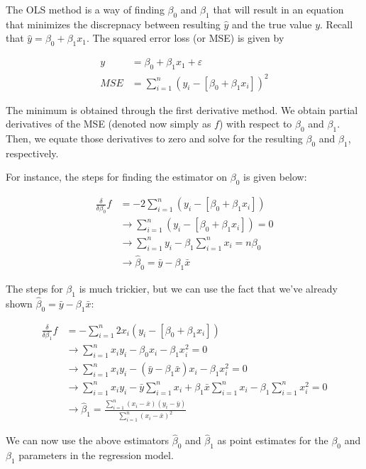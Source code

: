 \documentclass{article}
\begin{document}
The OLS method is a way of finding $\beta_0$ and $\beta_1$ that will result in an equation that minimizes the discrepnacy between resulting $\hat{y}$ and the true value $y$. Recall that $\hat{y} = \beta_0 + \beta_1 x_1$. The squared error loss (or MSE) is given by

$$
\begin{aligned}
y &= \beta_0 + \beta_1 x_1 + \varepsilon \\
MSE &= \sum^{n}_{i=1}(y_i - [\beta_0 + \beta_1 x_i])^2
\end{aligned}
$$

The minimum is obtained through the first derivative method. We obtain partial derivatives of the MSE (denoted now simply as $f$) with respect to $\beta_0$ and $\beta_1$. Then, we equate those derivatives to zero and solve for the resulting $\beta_0$ and $\beta_1$, respectively.

For instance, the steps for finding the estimator on $\beta_0$ is given below:

$$
\begin{aligned}
\frac{\delta}{\delta \beta_0} f &= - 2 \sum^{n}_{i=1}(y_i - [\beta_0 + \beta_1 x_i]) \\
&\to \sum^{n}_{i=1}(y_i - [\beta_0 + \beta_1 x_i]) = 0 \\
&\to \sum^{n}_{i=1}{y_i} - \beta_1 \sum^{n}_{i=1}{x_i} = n \beta_0 \\
&\to \hat{\beta}_0 = \bar{y} - \beta_1 \bar{x}
\end{aligned}
$$

The steps for $\beta_1$ is much trickier, but we can use the fact that we've already shown $\hat{\beta}_0 = \bar{y} - \beta_1 \bar{x}$:

$$
\begin{aligned}
\frac{\delta}{\delta \beta_1} f &= - \sum^{n}_{i=1}{2 x_i(y_i - [\beta_0 + \beta_1 x_i])} \\
& \to \sum^{n}_{i=1}{x_i y_i - \beta_0 x_i - \beta_1 x^2_i} = 0 \\
& \to \sum^{n}_{i=1}{x_i y_i - (\bar{y} - \beta_1 \bar{x}) x_i - \beta_1 x^2_i} = 0 \\
& \to \sum^{n}_{i=1}{x_i y_i} - \bar{y}\sum^{n}_{i=1}{x_i} + \beta_1 \bar{x} \sum^{n}_{i=1}{x_i} - \beta_1 \sum^{n}_{i=1}{x^2_i} = 0 \\
& \to \hat{\beta}_1 = \frac{\sum^{n}_{i=1}{(x_i - \bar{x})(y_i - \bar{y})}}{\sum^{n}_{i=1}{(x_i - \bar{x})^2}}
\end{aligned}
$$

We can now use the above estimators $\hat{\beta}_0$ and $\hat{\beta}_1$ as point estimates for the $\beta_0$ and $\beta_1$ parameters in the regression model.
\end{document}
